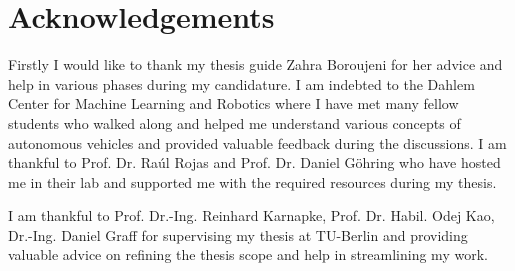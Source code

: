 \chapter*{Acknowledgements}

Firstly I would like to thank my thesis guide Zahra Boroujeni for her advice and help in various phases during my candidature. I am indebted to the Dahlem Center for Machine Learning and Robotics where I have met many fellow students who walked along and helped me understand various concepts of autonomous vehicles and provided valuable feedback during the discussions. I am thankful to Prof. Dr. Raúl Rojas and Prof. Dr. Daniel Göhring who have hosted me in their lab and supported me with the required resources during my thesis. 

I am thankful to Prof. Dr.-Ing. Reinhard Karnapke, Prof. Dr. Habil. Odej Kao, Dr.-Ing. Daniel Graff for supervising my thesis at TU-Berlin and providing valuable advice on refining the thesis scope and help in streamlining my work. 
